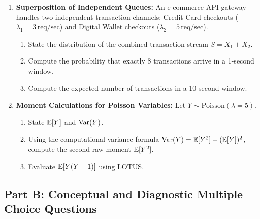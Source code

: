\begin{enumerate}
    \item \textbf{Superposition of Independent Queues:} An e-commerce API gateway handles two independent transaction channels: Credit Card checkouts ($\lambda_1 = 3\,\text{req/sec}$) and Digital Wallet checkouts ($\lambda_2 = 5\,\text{req/sec}$).
    \begin{enumerate}
        \item State the distribution of the combined transaction stream $S = X_1 + X_2$.
        \item Compute the probability that exactly 8 transactions arrive in a 1-second window.
        \item Compute the expected number of transactions in a 10-second window.
    \end{enumerate}

    \item \textbf{Moment Calculations for Poisson Variables:} Let $Y \sim \text{Poisson}(\lambda = 5)$.
    \begin{enumerate}
        \item State $\mathbb{E}[Y]$ and $\operatorname{Var}(Y)$.
        \item Using the computational variance formula $\operatorname{Var}(Y) = \mathbb{E}[Y^2] - (\mathbb{E}[Y])^2$, compute the second raw moment $\mathbb{E}[Y^2]$.
        \item Evaluate $\mathbb{E}[Y(Y - 1)]$ using LOTUS.
    \end{enumerate}
\end{enumerate}

\subsection*{Part B: Conceptual and Diagnostic Multiple Choice Questions}


